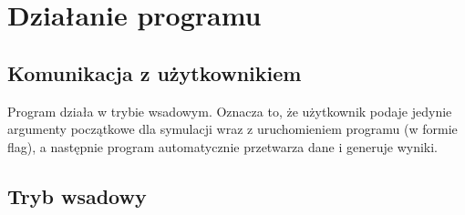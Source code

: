 \documentclass{report}
\begin{document}
\chapter{Działanie programu}

\section{Komunikacja z użytkownikiem}
Program działa w trybie wsadowym. Oznacza to, że użytkownik podaje jedynie argumenty początkowe dla symulacji wraz z uruchomieniem programu (w formie flag), a następnie program automatycznie przetwarza dane i generuje wyniki.

\section{Tryb wsadowy}
\end{document}
